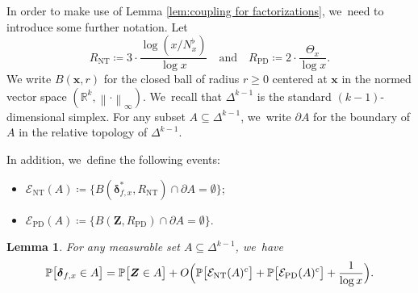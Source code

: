 \documentclass[JEP,XML,SOM,Unicode,published]{cedram}
\newcommand{\bx}{{\boldsymbol x}}
\newcommand{\bZ}{{\boldsymbol Z}}
\newcommand{\RR}{\mathbb{R}}
\newcommand{\PP}{\mathbb{P}}
\newcommand{\bolddelta}{\boldsymbol{\delta}}
\newcommand{\EC}{\mathcal{E}}
\newcommand{\maxnorm}[1]{\left\| #1 \right\|_{\infty}}
\newcommand{\simplex}{\Delta^{k-1}}
\newcommand{\bg}{\big}
\newcommand{\Rnt}{R_{\mathrm{NT}}}
\newcommand{\Rprob}{R_{\mathrm{PD}}}
\newcommand{\ECnt}{\EC_{\mathrm{NT}}}
\newcommand{\ECprob}{\EC_{\mathrm{PD}}}
\theoremstyle{plain}
\newtheorem{lem}[cor]{Lemma}
\theoremstyle{definition}
\begin{document}
In order to make use of Lemma \ref{lem:coupling for factorizations}, we~need to introduce some further notation. Let
\[
\Rnt \coloneqq 3\cdot \frac{\log(x/N_x^\flat)}{\log x} \quad \text{and} \quad \Rprob \coloneqq 2\cdot \frac{\Theta_x}{\log x}.
\]
We write $B(\bx,r)$ for the closed ball of radius $r \ge 0$ centered at $\bx$ in the normed vector space $(\RR^k, \maxnorm{\cdot})$. We~recall that $\simplex$ is the standard $(k-1)$-dimensional simplex. For any subset $A \subseteq \simplex$, we~write $\partial A$ for the boundary of $A$ in the relative topology of $\simplex$.

In addition, we~define the following events:
\begin{itemize}
\item $\ECnt(A) \coloneqq \bg\{ B(\bolddelta_{f, x}^*, \Rnt)\cap \partial A=\emptyset\bg\}$;

\item $\ECprob(A) \coloneqq \bg\{ B(\bZ, \Rprob) \cap \partial A = \emptyset \bg\}$.
\end{itemize}

\begin{lem}
\label{lem:sym diff D and Z}
For any measurable set $A\subseteq\simplex$, we~have
\[
\PP\bg[\bolddelta_{f, x} \in A\bg] = \PP\bg[\bZ \in A\bg] + O\Bigl(\PP\bg[\ECnt(A)^c\bg] + \PP\bg[\ECprob(A)^c\bg] + \frac{1}{\log x}\Bigr).
\]
\end{lem}
\end{document}
